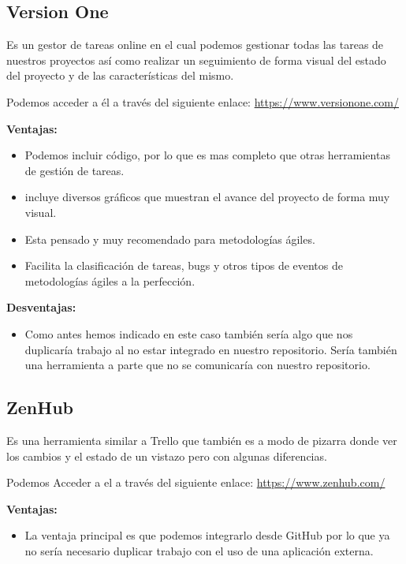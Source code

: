 \subsection{Version One}
Es un gestor de tareas online en el cual podemos gestionar todas las tareas de nuestros proyectos así como realizar un seguimiento de forma visual del estado del proyecto y de las características del mismo.

Podemos acceder a él a través del siguiente enlace: 
\url{https://www.versionone.com/}


\textbf{Ventajas:}

\begin{itemize}
\item Podemos incluir código, por lo que es mas completo que otras herramientas de gestión de tareas.
\item incluye diversos gráficos que muestran el avance del proyecto de forma muy visual.
\item Esta pensado y muy recomendado para metodologías ágiles.
\item Facilita la clasificación de tareas, bugs y otros tipos de eventos de metodologías ágiles a la perfección.
\end{itemize}

\textbf{Desventajas:}

\begin{itemize}
\item Como antes hemos indicado en este caso también sería algo que nos duplicaría trabajo al no estar integrado en nuestro repositorio. Sería también una herramienta a parte que no se comunicaría con nuestro repositorio.
\end{itemize}


\subsection{ZenHub}
Es una herramienta similar a Trello que también es a modo de pizarra donde ver los cambios y el estado de un vistazo pero con algunas diferencias.

Podemos Acceder a el a través del siguiente enlace: 
\url{https://www.zenhub.com/}



\textbf{Ventajas:}

\begin{itemize}
\item La ventaja principal es que podemos integrarlo desde GitHub por lo que ya no sería necesario duplicar trabajo con el uso de una aplicación externa.
\end{itemize}

